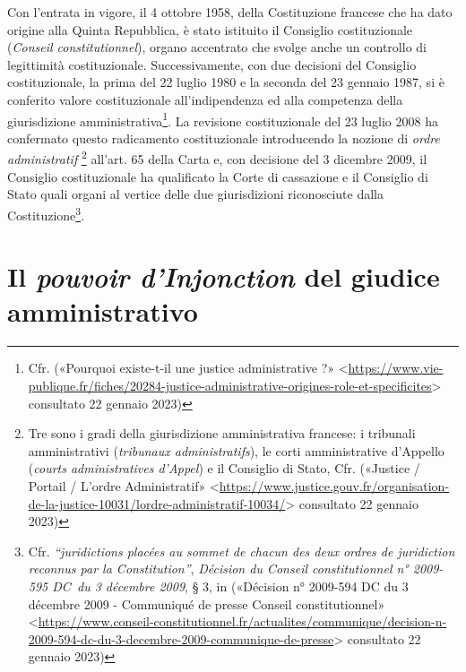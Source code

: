 \documentclass[12pt,it,a4paper,]{report}
\begin{document}
Con l'entrata in vigore, il 4 ottobre 1958, della Costituzione francese
che ha dato origine alla Quinta Repubblica, è stato istituito il
Consiglio costituzionale (\emph{Conseil constitutionnel}), organo
accentrato che svolge anche un controllo di legittimità costituzionale.
Successivamente, con due decisioni del Consiglio costituzionale, la
prima del 22 luglio 1980 e la seconda del 23 gennaio 1987, si è
conferito valore costituzionale all'indipendenza ed alla competenza
della giurisdizione amministrativa\footnote{Cfr. ({«Pourquoi existe-t-il
  une justice administrative ?»}
  \textless{}\url{https://www.vie-publique.fr/fiches/20284-justice-administrative-origines-role-et-specificites}\textgreater{}
  consultato 22 gennaio 2023)}. La revisione costituzionale del 23
luglio 2008 ha confermato questo radicamento costituzionale introducendo
la nozione di \emph{ordre administratif} \footnote{Tre sono i gradi
  della giurisdizione amministrativa francese: i tribunali
  amministrativi (\emph{tribunaux administratifs}), le corti
  amministrative d'Appello (\emph{courts administratives d'Appel}) e il
  Consiglio di Stato, Cfr. ({«Justice / {Portail} / {L}'ordre
  Administratif»}
  \textless{}\url{https://www.justice.gouv.fr/organisation-de-la-justice-10031/lordre-administratif-10034/}\textgreater{}
  consultato 22 gennaio 2023)} all'art. 65 della Carta e, con decisione
del 3 dicembre 2009, il Consiglio costituzionale ha qualificato la Corte
di cassazione e il Consiglio di Stato quali organi al vertice delle due
giurisdizioni riconosciute dalla Costituzione\footnote{Cfr.
  \emph{``juridictions placées au sommet de chacun des deux ordres de
  juridiction reconnus par la Constitution''}, \emph{Décision du Conseil
  constitutionnel n° 2009-595 DC~du 3 décembre 2009}, § 3, in
  ({«Décision n° 2009-594 DC du 3 décembre 2009 - Communiqué de presse
  \textbar{} Conseil constitutionnel»}
  \textless{}\url{https://www.conseil-constitutionnel.fr/actualites/communique/decision-n-2009-594-dc-du-3-decembre-2009-communique-de-presse}\textgreater{}
  consultato 22 gennaio 2023)}.

\hypertarget{il-pouvoir-dinjonction-del-giudice-amministrativo}{%
\section{\texorpdfstring{Il \emph{pouvoir d'Injonction} del giudice
amministrativo}{Il pouvoir d'Injonction del giudice amministrativo}}\label{il-pouvoir-dinjonction-del-giudice-amministrativo}}
\end{document}
